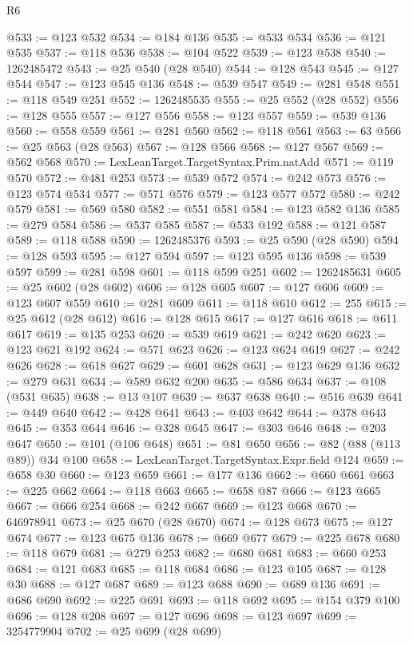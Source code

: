 \begin{lexlean}{R6}
\begin{coremodule}
@533 := @123 @532
@534 := @184 @136
@535 := @533 @534
@536 := @121 @535
@537 := @118 @536
@538 := @104 @522
@539 := @123 @538
@540 := 1262485472
@543 := @25 @540 (@28 @540)
@544 := @128 @543
@545 := @127 @544
@547 := @123 @545 @136
@548 := @539 @547
@549 := @281 @548
@551 := @118 @549 @251
@552 := 1262485535
@555 := @25 @552 (@28 @552)
@556 := @128 @555
@557 := @127 @556
@558 := @123 @557
@559 := @539 @136
@560 := @558 @559
@561 := @281 @560
@562 := @118 @561
@563 := 63
@566 := @25 @563 (@28 @563)
@567 := @128 @566
@568 := @127 @567
@569 := @562 @568
@570 := LexLeanTarget.TargetSyntax.Prim.natAdd
@571 := @119 @570
@572 := @481 @253
@573 := @539 @572
@574 := @242 @573
@576 := @123 @574 @534
@577 := @571 @576
@579 := @123 @577 @572
@580 := @242 @579
@581 := @569 @580
@582 := @551 @581
@584 := @123 @582 @136
@585 := @279 @584
@586 := @537 @585
@587 := @533 @192
@588 := @121 @587
@589 := @118 @588
@590 := 1262485376
@593 := @25 @590 (@28 @590)
@594 := @128 @593
@595 := @127 @594
@597 := @123 @595 @136
@598 := @539 @597
@599 := @281 @598
@601 := @118 @599 @251
@602 := 1262485631
@605 := @25 @602 (@28 @602)
@606 := @128 @605
@607 := @127 @606
@609 := @123 @607 @559
@610 := @281 @609
@611 := @118 @610
@612 := 255
@615 := @25 @612 (@28 @612)
@616 := @128 @615
@617 := @127 @616
@618 := @611 @617
@619 := @135 @253
@620 := @539 @619
@621 := @242 @620
@623 := @123 @621 @192
@624 := @571 @623
@626 := @123 @624 @619
@627 := @242 @626
@628 := @618 @627
@629 := @601 @628
@631 := @123 @629 @136
@632 := @279 @631
@634 := @589 @632 @200
@635 := @586 @634
@637 := @108 (@531 @635)
@638 := @13 @107
@639 := @637 @638
@640 := @516 @639
@641 := @449 @640
@642 := @428 @641
@643 := @403 @642
@644 := @378 @643
@645 := @353 @644
@646 := @328 @645
@647 := @303 @646
@648 := @203 @647
@650 := @101 (@106 @648)
@651 := @81 @650
@656 := @82 (@88 (@113 @89)) @34 @100
@658 := LexLeanTarget.TargetSyntax.Expr.field @124
@659 := @658 @30
@660 := @123 @659
@661 := @177 @136
@662 := @660 @661
@663 := @225 @662
@664 := @118 @663
@665 := @658 @87
@666 := @123 @665
@667 := @666 @254
@668 := @242 @667
@669 := @123 @668
@670 := 646978941
@673 := @25 @670 (@28 @670)
@674 := @128 @673
@675 := @127 @674
@677 := @123 @675 @136
@678 := @669 @677
@679 := @225 @678
@680 := @118 @679
@681 := @279 @253
@682 := @680 @681
@683 := @660 @253
@684 := @121 @683
@685 := @118 @684
@686 := @123 @105
@687 := @128 @30
@688 := @127 @687
@689 := @123 @688
@690 := @689 @136
@691 := @686 @690
@692 := @225 @691
@693 := @118 @692
@695 := @154 @379 @100
@696 := @128 @208
@697 := @127 @696
@698 := @123 @697
@699 := 3254779904
@702 := @25 @699 (@28 @699)

\end{coremodule}
\end{lexlean}
